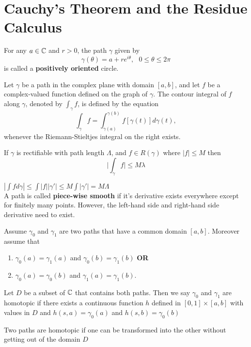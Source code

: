 \documentclass[10pt,a4paper]{book}
\begin{document}
\chapter{Cauchy's Theorem and the Residue Calculus}
\begin{deff}
    For any $a \in \mathbb{C}$ and $r > 0$, the path $\gamma$ given by
    $$\gamma(\theta) = a + re^{i\theta}, \ \ \ 0 \leq \theta \leq 2\pi$$
    is called a \textbf{positively oriented} circle.
\end{deff}
\begin{deff}
 Let $\gamma$ be a path in the complex plane with domain $[a, b]$, and let $f$ be a complex-valued function defined on the graph of $\gamma$. The contour integral of $f$ along $\gamma$, denoted by $\int_\gamma f$, is defined by the equation
    $$\int_{\gamma} f  = \int_{\gamma(a)}^{\gamma(b)} f[\gamma(t)]d\gamma(t),$$
whenever the Riemann-Stieltjes integral on the right exists.
\end{deff}
\begin{Thm}
If $\gamma$ is rectifiable with path length $\Lambda$, and $f \in R(\gamma)$ where $|f| \leq M$ then 
$$\bigg|\int_\gamma f \bigg| \leq M\lambda$$
\end{Thm}
\PP $|\int f d\gamma| \leq \int |f||\gamma'| \leq M\int |\gamma'| = M\Lambda$
\\ 
A path is called \textbf{piece-wise smooth} if it's derivative exists everywhere except for finitely many points. However, the left-hand side and right-hand side derivative need to exist.

\begin{deff}
Assume $\gamma_0$ and $\gamma_1$ are two paths that have a common domain $[a,b]$. Moreover assume that 
\begin{enumerate}
    \item $\gamma_0(a) = \gamma_1(a)$ and $\gamma_0(b) = \gamma_1(b)$ \textbf{OR}
    \item $\gamma_0(a) = \gamma_0(b)$ and $\gamma_1(a) = \gamma_1(b).$



\end{enumerate}
Let $D$ be a subset of $\mathbb{C}$ that contains both paths. Then we say $\gamma_0$ and $\gamma_1$ are homotopic if there exists a continuous function $h$ defined in $[0,1] \times [a,b]$ with values in $D$ and $h(s, a) = \gamma_0(a)$ and $h(s,b) = \gamma_0(b)$
\end{deff}
\PP Two paths are homotopic if one can be transformed into the other without getting out of the domain $D$
\end{document}
